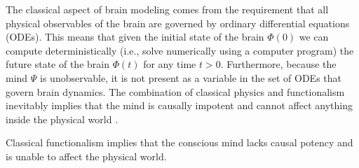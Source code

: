 \documentclass{ws-ijmpb}
\begin{document}
The classical aspect of brain modeling comes from the requirement
that all physical observables of the brain are governed by ordinary
differential equations (ODEs). This means that given the initial state
of the brain $\Phi(0)$ we can compute deterministically (i.e., solve numerically using a computer program) the future
state of the brain $\Phi(t)$ for any time $t>0$. Furthermore, because
the mind $\Psi$ is unobservable, it is not present as a variable
in the set of ODEs that govern brain dynamics.
The combination of classical physics and functionalism inevitably
implies that the mind is causally impotent and cannot affect anything
inside the physical world \cite{Georgiev2017}.

\begin{theorem}
\label{thm:1}
Classical functionalism implies that the conscious mind lacks causal potency and is unable to affect the physical world.
\end{theorem}
\end{document}

